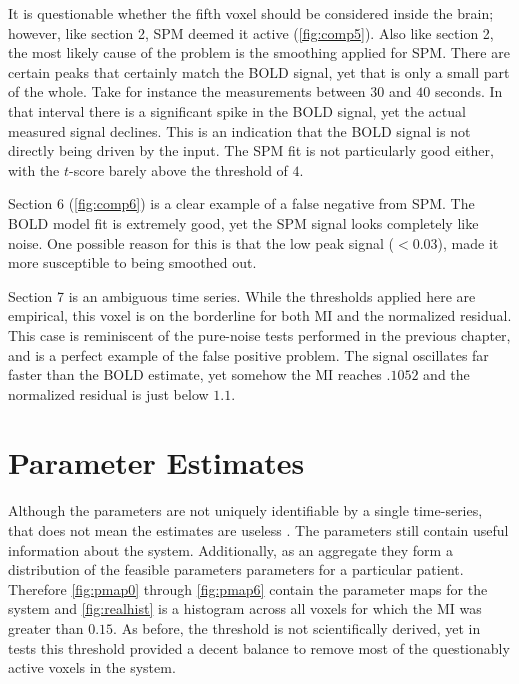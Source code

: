 It is questionable whether the fifth voxel should be considered inside the
brain; however, like section 2, \ac{SPM} deemed it active (\autoref{fig:comp5}).
Also like section 2, the most likely cause of the problem is the smoothing
applied for \ac{SPM}. There are certain peaks that certainly match the
\ac{BOLD} signal, yet that is only a small part of the whole.
Take for instance the measurements between $30$ and $40$ seconds.
In that interval there is a significant spike in the \ac{BOLD} signal, yet the
actual measured signal declines. This is an indication that the \ac{BOLD} signal is not directly
being driven by the input. The \ac{SPM} fit is not particularly good either,
with the $t$-score barely above the threshold of $4$.

Section 6 (\autoref{fig:comp6}) is a clear example of a false negative
from \ac{SPM}. The \ac{BOLD} model fit is extremely good, yet the \ac{SPM} signal looks completely
like noise. One possible reason for this is that the low peak signal ($<0.03$),
made it more susceptible to being smoothed out.

Section 7 is an ambiguous time series. While the thresholds applied here
are empirical, this voxel is on the borderline for both \ac{MI}
and the normalized residual.
This case is reminiscent of the pure-noise tests performed in the previous chapter,
and is a perfect example of the false positive problem.
The signal oscillates far faster than the \ac{BOLD} estimate, yet
somehow the \ac{MI} reaches $.1052$ and the normalized residual is just below $1.1$.

\section{Parameter Estimates}
\label{sec:Real Data Parameter Estimates}
Although the parameters are not uniquely identifiable by a single time-series, that
does not mean the estimates are useless . The parameters still contain useful
information about the system. Additionally, as an aggregate they form a distribution of
the feasible parameters parameters for a particular patient. Therefore
\autoref{fig:pmap0} through \autoref{fig:pmap6}
contain the parameter maps for the system and \autoref{fig:realhist} is a histogram across all voxels
for which the \ac{MI} was greater than $0.15$. As before, the threshold is not
scientifically derived, yet in tests this threshold provided a decent balance to remove most
of the questionably active voxels in the system.

